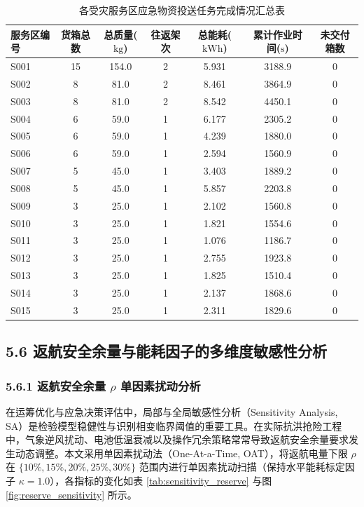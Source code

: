 \documentclass[12pt,a4paper,UTF8]{ctexart}
\begin{document}
\begin{table}[H]
\centering
\small
\caption{各受灾服务区应急物资投送任务完成情况汇总表}
\label{tab:service_summary}
\begin{tabularx}{\textwidth}{l c c c c c c}
\toprule
\textbf{服务区编号} & \textbf{货箱总数} & \textbf{总质量}($\text{kg}$) & \textbf{往返架次} & \textbf{总能耗}($\text{kWh}$) & \textbf{累计作业时间}($\text{s}$) & \textbf{未交付箱数} \\
\midrule
S001 & 15 & 154.0 & 2 & 5.931 & 3188.9 & 0 \\
S002 & 8 & 81.0 & 2 & 8.461 & 3864.9 & 0 \\
S003 & 8 & 81.0 & 2 & 8.542 & 4450.1 & 0 \\
S004 & 6 & 59.0 & 1 & 6.177 & 2305.2 & 0 \\
S005 & 6 & 59.0 & 1 & 4.239 & 1880.0 & 0 \\
S006 & 6 & 59.0 & 1 & 2.594 & 1560.9 & 0 \\
S007 & 5 & 45.0 & 1 & 3.403 & 1889.2 & 0 \\
S008 & 5 & 45.0 & 1 & 5.857 & 2203.8 & 0 \\
S009 & 3 & 25.0 & 1 & 2.102 & 1560.8 & 0 \\
S010 & 3 & 25.0 & 1 & 1.821 & 1554.6 & 0 \\
S011 & 3 & 25.0 & 1 & 1.076 & 1186.7 & 0 \\
S012 & 3 & 25.0 & 1 & 2.755 & 1923.8 & 0 \\
S013 & 3 & 25.0 & 1 & 1.825 & 1510.4 & 0 \\
S014 & 3 & 25.0 & 1 & 2.137 & 1868.6 & 0 \\
S015 & 3 & 25.0 & 1 & 2.311 & 1829.6 & 0 \\
\bottomrule
\end{tabularx}
\end{table}

\subsection{5.6 返航安全余量与能耗因子的多维度敏感性分析}

\subsubsection{5.6.1 返航安全余量 $\rho$ 单因素扰动分析}
在运筹优化与应急决策评估中，局部与全局敏感性分析（Sensitivity Analysis, SA）是检验模型稳健性与识别相变临界阈值的重要工具\cite{saltelli2008}。在实际抗洪抢险工程中，气象逆风扰动、电池低温衰减以及操作冗余策略常常导致返航安全余量要求发生动态调整。本文采用单因素扰动法（One-At-a-Time, OAT），将返航电量下限 $\rho$ 在 $\{10\%, 15\%, 20\%, 25\%, 30\%\}$ 范围内进行单因素扰动扫描（保持水平能耗标定因子 $\kappa=1.0$），各指标的变化如表 \ref{tab:sensitivity_reserve} 与图 \ref{fig:reserve_sensitivity} 所示。
\end{document}
